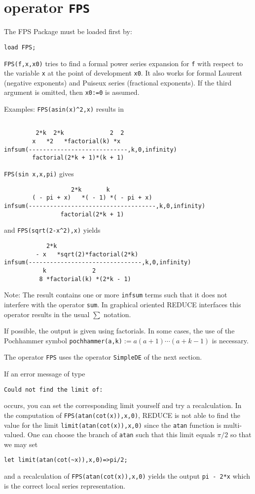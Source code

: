 \section{\REDUCE{} operator {\tt FPS}}
The FPS Package must be loaded first by:
\begin{verbatim}
load FPS;
\end{verbatim}
{\tt FPS(f,x,x0)} tries to find a formal power
series expansion for {\tt f} with respect to the variable {\tt x} 
at the point of development {\tt x0}. 
It also works for formal Laurent (negative exponents) and Puiseux series
(fractional exponents). If the third 
argument is omitted, then {\tt x0:=0} is assumed.

Examples: {\tt FPS(asin(x)\verb+^+2,x)} results in
\begin{verbatim}

         2*k  2*k             2  2
        x   *2   *factorial(k) *x
infsum(----------------------------,k,0,infinity)
        factorial(2*k + 1)*(k + 1)
\end{verbatim}
{\tt FPS(sin x,x,pi)} gives
\begin{verbatim}
                   2*k       k
        ( - pi + x)   *( - 1) *( - pi + x)
infsum(------------------------------------,k,0,infinity)
                factorial(2*k + 1)
\end{verbatim}
and {\tt FPS(sqrt(2-x\verb+^+2),x)} yields
\begin{verbatim}
            2*k
         - x   *sqrt(2)*factorial(2*k)
infsum(--------------------------------,k,0,infinity)
           k             2
          8 *factorial(k) *(2*k - 1)
\end{verbatim}
Note: The result contains one or more {\tt infsum} terms such that it does
not interfere with the {\REDUCE} operator {\tt sum}. In graphical oriented
REDUCE interfaces this operator results in the usual $\sum$ notation.

If possible, the output is given using factorials. In some cases, the
use of the Pochhammer symbol {\tt pochhammer(a,k)}$:=a(a+1)\cdots(a+k-1)$
is necessary.

The operator {\tt FPS} uses the operator {\tt SimpleDE} of the next section.

If an error message of type
\begin{verbatim}
Could not find the limit of:
\end{verbatim}
occurs, you can set the corresponding limit yourself and try a
recalculation. In the computation of {\tt FPS(atan(cot(x)),x,0)},
REDUCE is not able to find the value for the limit 
{\tt limit(atan(cot(x)),x,0)} since the {\tt atan} function is multi-valued.
One can choose the branch of {\tt atan} such that this limit equals
$\pi/2$ so that we may set 
\begin{verbatim}
let limit(atan(cot(~x)),x,0)=>pi/2;
\end{verbatim}
and a recalculation of {\tt FPS(atan(cot(x)),x,0)}
yields the output {\tt pi - 2*x} which is
the correct local series representation.

